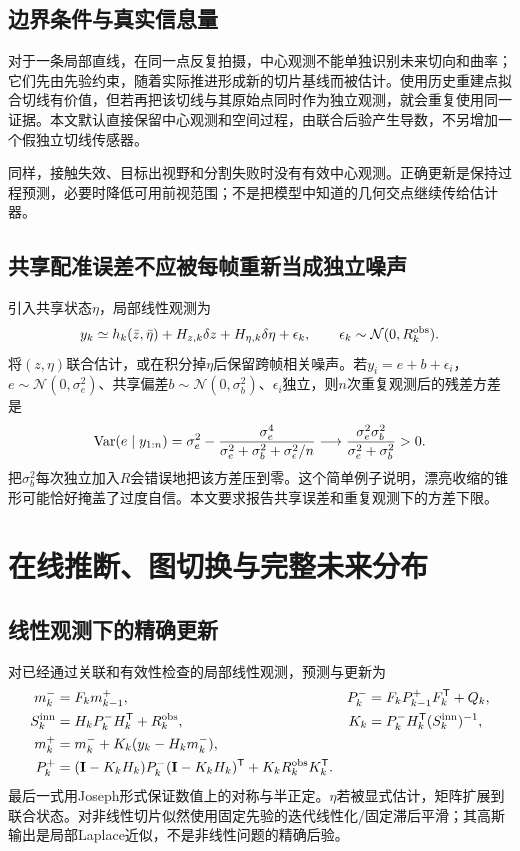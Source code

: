 \documentclass[UTF8,11pt,a4paper,fontset=fandol]{ctexart}
\numberwithin{equation}{section}
\theoremstyle{plain}
\theoremstyle{definition}
\theoremstyle{remark}
\newcommand{\Normal}{\mathcal N}\newcommand{\dd}{\mathrm d}
\newcommand{\Id}{\mathbf I}\newcommand{\T}{^{\mathsf T}}
\begin{document}
\subsection{边界条件与真实信息量}
对于一条局部直线，在同一点反复拍摄，中心观测不能单独识别未来切向和曲率；它们先由先验约束，随着实际推进形成新的切片基线而被估计。使用历史重建点拟合切线有价值，但若再把该切线与其原始点同时作为独立观测，就会重复使用同一证据。本文默认直接保留中心观测和空间过程，由联合后验产生导数，不另增加一个假独立切线传感器。

同样，接触失效、目标出视野和分割失败时没有有效中心观测。正确更新是保持过程预测，必要时降低可用前视范围；不是把模型中知道的几何交点继续传给估计器。

\subsection{共享配准误差不应被每帧重新当成独立噪声}
引入共享状态$\eta$，局部线性观测为
\begin{equation}
 y_k\simeq h_k(\bar z,\bar\eta)+H_{z,k}\delta z+H_{\eta,k}\delta\eta+\epsilon_k,
 \qquad\epsilon_k\sim\Normal(0,R_k^{\rm obs}).
 \label{eq:nuisance-model}
\end{equation}
将$(z,\eta)$联合估计，或在积分掉$\eta$后保留跨帧相关噪声。若$y_i=e+b+\epsilon_i$，$e\sim\Normal(0,\sigma_e^2)$、共享偏差$b\sim\Normal(0,\sigma_b^2)$、$\epsilon_i$独立，则$n$次重复观测后的残差方差是
\begin{equation}
 \operatorname{Var}(e\mid y_{1:n})=
 \sigma_e^2-\frac{\sigma_e^4}{\sigma_e^2+\sigma_b^2+\sigma_\epsilon^2/n}
 \longrightarrow
 \frac{\sigma_e^2\sigma_b^2}{\sigma_e^2+\sigma_b^2}>0.
 \label{eq:registration-floor}
\end{equation}
把$\sigma_b^2$每次独立加入$R$会错误地把该方差压到零。这个简单例子说明，漂亮收缩的锥形可能恰好掩盖了过度自信。本文要求报告共享误差和重复观测下的方差下限。

\section{在线推断、图切换与完整未来分布}\label{sec:inference}
\subsection{线性观测下的精确更新}
对已经通过关联和有效性检查的局部线性观测，预测与更新为
\begin{align}
 m_k^-&=F_km_{k-1}^+,&
 P_k^-&=F_kP_{k-1}^+F_k\T+Q_k,\\
 S_k^{\rm inn}&=H_kP_k^-H_k\T+R_k^{\rm obs},&
 K_k&=P_k^-H_k\T(S_k^{\rm inn})^{-1},\\
 m_k^+&=m_k^-+K_k(y_k-H_km_k^-),\\
 P_k^+&=(\Id-K_kH_k)P_k^-(\Id-K_kH_k)\T+K_kR_k^{\rm obs}K_k\T.
 \label{eq:kalman}
\end{align}
最后一式用Joseph形式保证数值上的对称与半正定。$\eta$若被显式估计，矩阵扩展到联合状态。对非线性切片似然使用固定先验的迭代线性化/固定滞后平滑；其高斯输出是局部Laplace近似，不是非线性问题的精确后验。
\end{document}
